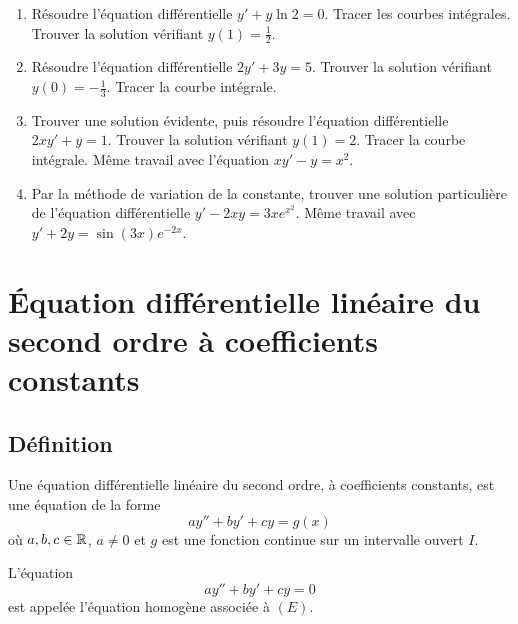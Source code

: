 \documentclass[class=report,crop=false]{standalone}
\begin{document}
\begin{miniexercices}
\sauteligne
\begin{enumerate}
  \item Résoudre l'équation différentielle $y'+ y \ln 2 = 0$.
  Tracer les courbes intégrales. Trouver la solution vérifiant $y(1)=\frac12$.

  \item Résoudre l'équation différentielle $2y'+3y=5$.
  Trouver la solution vérifiant $y(0)=-\frac13$. Tracer la courbe intégrale.

  \item Trouver une solution évidente, puis résoudre l'équation
  différentielle $2xy'+y=1$. Trouver la solution
  vérifiant $y(1)=2$. Tracer la courbe intégrale.
  Même travail avec l'équation $xy'-y=x^2$.

  \item Par la méthode de variation de la constante, trouver une solution
  particulière de l'équation différentielle $y'-2xy=3xe^{x^2}$.
  Même travail avec $y'+2y = \sin(3x)e^{-2x}$.
\end{enumerate}
\end{miniexercices}


\section{Équation différentielle linéaire du second ordre à coefficients constants}

\subsection{Définition}


Une équation différentielle linéaire du second ordre, à
 coefficients constants, est une équation de la forme
\begin{equation}
ay''+by'+cy=g(x)
\label{eq:linscd}
\tag{$E$}
\end{equation}
où $a,b,c \in \mathbb{R}$, $a \neq 0$ et $g$ est une fonction continue sur
un intervalle ouvert $I$.

L'équation
\begin{equation}
ay''+by'+cy=0
\label{eq:linscdhom}
\tag{$E_0$}
\end{equation}
est appelée l'équation homogène associée à $(E)$.
\end{document}
